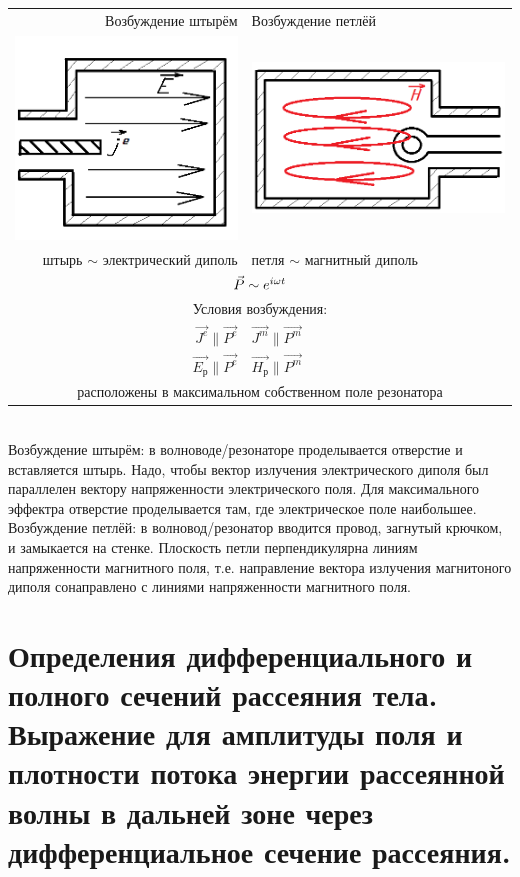 \begin{multicols*}{2}
		\begin{tabular}{r || l}
			{Возбуждение штырём} & {Возбуждение петлёй} \\
			\includegraphics[width=0.25\linewidth]{aed_imgs/ask15_1} &
			\includegraphics[width=0.25\linewidth]{aed_imgs/ask15_2} \\
			{штырь $\sim$ электрический диполь} & {петля $\sim$ магнитный диполь} \\
			\multicolumn{2}{c}{$\vec{P}\sim e^{i\omega t}$} \\
			\multicolumn{2}{c}{Условия возбуждения:} \\
			{$\vec{J^e} \parallel\vec{P^e}$} & {$\vec{J^m} \parallel\vec{P^m}$} \\
			{$\vec{E_\text{р}} \parallel\vec{P^e}$} & {$\vec{H_\text{р}}\parallel\vec{P^m}$} \\
			\multicolumn{2}{c}{расположены в максимальном собственном поле резонатора} \\
		\end{tabular}\\
		Возбуждение штырём: в волноводе/резонаторе проделывается отверстие и вставляется штырь. Надо, чтобы вектор излучения электрического диполя был параллелен вектору напряженности электрического поля. Для максимального эффектра отверстие проделывается там, где электрическое поле наибольшее.\\
		Возбуждение петлёй: в волновод/резонатор вводится провод, загнутый крючком, и замыкается на стенке. Плоскость петли перпендикулярна линиям напряженности магнитного поля, т.е. направление вектора излучения магнитоного диполя сонаправлено с линиями напряженности магнитного поля.
		
		\section{Определения дифференциального и полного сечений рассеяния тела. Выражение для амплитуды поля и плотности потока энергии рассеянной волны в дальней зоне через дифференциальное сечение рассеяния.}
		

\end{multicols*}
